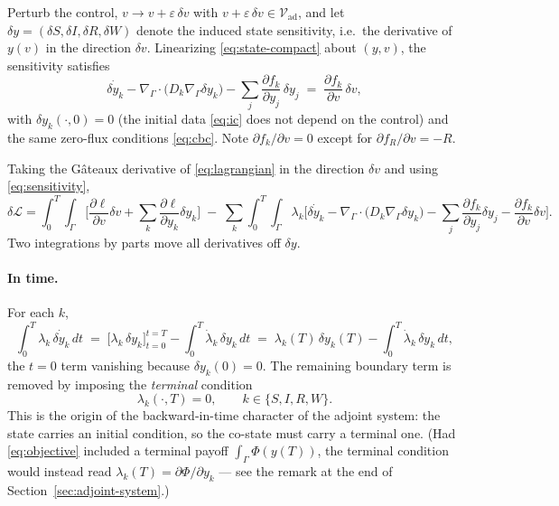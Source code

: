 \documentclass[11pt]{article}
\newcommand{\Grad}{\nabla_\Gamma}
\newcommand{\Div}{\nabla_\Gamma\cdot}
\newcommand{\Vad}{\mathcal{V}_{\mathrm{ad}}}
\newcommand{\Lag}{\mathcal{L}}
\begin{document}
Perturb the control, $v \to v + \varepsilon\,\delta v$ with $v+\varepsilon\,\delta v\in\Vad$, and let $\delta y = (\delta S,\delta I,\delta R,\delta W)$ denote the induced state sensitivity, i.e.\ the derivative of $y(v)$ in the direction $\delta v$. Linearizing \eqref{eq:state-compact} about $(y,v)$, the sensitivity satisfies
\begin{equation}
\dot{\delta y_k} - \Div\big(D_k\Grad \delta y_k\big) - \sum_j \frac{\partial f_k}{\partial y_j}\,\delta y_j \;=\; \frac{\partial f_k}{\partial v}\,\delta v,
\label{eq:sensitivity}
\end{equation}
with $\delta y_k(\cdot,0)=0$ (the initial data \eqref{eq:ic} does not depend on the control) and the same zero-flux conditions \eqref{eq:cbc}. Note $\partial f_k/\partial v = 0$ except for $\partial f_R/\partial v = -R$.

Taking the Gâteaux derivative of \eqref{eq:lagrangian} in the direction $\delta v$ and using \eqref{eq:sensitivity},
\begin{equation}
\delta\Lag = \int_0^T\!\!\int_\Gamma\Big[\frac{\partial \ell}{\partial v}\delta v + \sum_k\frac{\partial \ell}{\partial y_k}\delta y_k\Big]
\;-\;\sum_k\int_0^T\!\!\int_\Gamma\lambda_k\Big[\dot{\delta y_k} - \Div\big(D_k\Grad\delta y_k\big) - \sum_j\frac{\partial f_k}{\partial y_j}\delta y_j - \frac{\partial f_k}{\partial v}\delta v\Big].
\label{eq:dLag}
\end{equation}
Two integrations by parts move all derivatives off $\delta y$.

\paragraph{In time.} For each $k$,
\[
\int_0^T \lambda_k\,\dot{\delta y_k}\,dt \;=\; \Big[\lambda_k\,\delta y_k\Big]_{t=0}^{t=T} - \int_0^T \dot\lambda_k\,\delta y_k\,dt
\;=\; \lambda_k(T)\,\delta y_k(T) - \int_0^T \dot\lambda_k\,\delta y_k\,dt,
\]
the $t=0$ term vanishing because $\delta y_k(0)=0$. The remaining boundary term is removed by imposing the \emph{terminal} condition
\begin{equation}
\lambda_k(\cdot,T) = 0, \qquad k\in\{S,I,R,W\}.
\label{eq:terminal}
\end{equation}
This is the origin of the backward-in-time character of the adjoint system: the state carries an initial condition, so the co-state must carry a terminal one. (Had \eqref{eq:objective} included a terminal payoff $\int_\Gamma \Phi(y(T))$, the terminal condition would instead read $\lambda_k(T)=\partial\Phi/\partial y_k$ --- see the remark at the end of Section~\ref{sec:adjoint-system}.)
\end{document}

